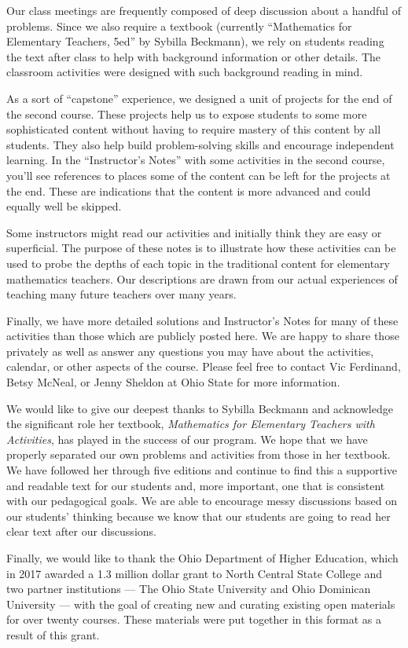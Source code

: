 \documentclass[nooutcomes]{ximera}
\begin{document}
Our class meetings are frequently composed of deep discussion about a handful of problems.  Since we also require 
a textbook (currently ``Mathematics for Elementary Teachers, 5ed'' by Sybilla Beckmann), we rely on 
students reading the text after class to help with background information or other details.  The 
classroom activities were designed with such background reading in mind.

As a sort of ``capstone'' experience, we designed a unit of projects for the end of the second 
course.  These projects help us to expose students to some more sophisticated content without 
having to require mastery of this content by all students.  They also help build problem-solving skills and 
encourage independent learning.  In the ``Instructor's Notes'' with some activities in the second 
course, you'll see references to places some of the content can be left for the projects at the end. 
These are indications that the content is more advanced and could equally well be skipped.

Some instructors might read our activities and initially think they are easy or superficial.  The purpose of these notes is to illustrate how these activities can be used to probe the depths of each topic in the traditional content for elementary mathematics teachers.  Our descriptions are drawn from our actual experiences of teaching many future teachers over many years.

Finally, we have more detailed solutions and Instructor's Notes for many of these activities than those 
which are publicly posted here.  We are happy to share those privately as well as answer any 
questions you may have about the activities, calendar, or other aspects of the course.  Please feel 
free to contact Vic Ferdinand, Betsy McNeal, or Jenny Sheldon at Ohio State for more information.

We would like to give our deepest thanks to Sybilla Beckmann and acknowledge the significant role her textbook, \emph{Mathematics for Elementary Teachers with Activities}, has played in the success of our program.  We hope that we have properly separated our own problems and activities from those in her textbook. We have followed her through five editions and continue to find this a supportive and readable text for our students and, more important, one that is consistent with our pedagogical goals. We are able to encourage messy discussions based on our students' thinking because we know that our students are going to read her clear text after our discussions.  

Finally, we would like to thank the Ohio Department of Higher Education, which in 2017 awarded a 1.3 million dollar grant to North Central State College and two partner institutions — The Ohio State University and Ohio Dominican University — with the goal of creating new and curating existing open materials for over twenty courses.  These materials were put together in this format as a result of this grant.
\end{document}

